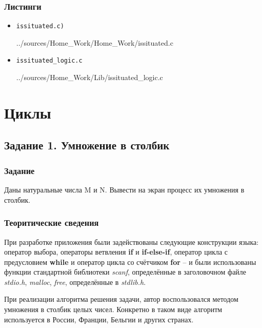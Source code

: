 \documentclass[12pt,a4paper]{report}
\begin{document}
\subsection*{Листинги}
\begin{itemize}
\item[] \verb-issituated.c)-

{../sources/Home_Work/Home_Work/issituated.c}

\item[] \verb-issituated_logic.c-

{../sources/Home_Work/Lib/issituated_logic.c}
\end{itemize}


%
\chapter{Циклы}
\section{Задание 1. Умножение в столбик}
\subsection{Задание}
\hspace{\parindent}
Даны натуральные числа M и N. Вывести на экран процесс их умножения в столбик.
\subsection{Теоритические сведения}
\hspace{\parindent}
При разработке приложения были задействованы следующие конструкции языка: оператор выбора, операторы ветвления \textbf{if} и \textbf{if-else-if}, оператор цикла с предусловием \textbf{while} и оператор цикла со счётчиком \textbf{for} -- и были использованы функции стандартной библиотеки \textit{scanf}, определённые в заголовочном файле \textit{stdio.h}, \textit{malloc}, \textit{free}, определённые в \textit{stdlib.h}.

\hspace{\parindent}
При реализации алгоритма решения задачи, автор воспользовался методом умножения в столбик целых чисел. Конкретно в таком виде алгоритм используется в России, Франции, Бельгии и других странах.
\end{document}
